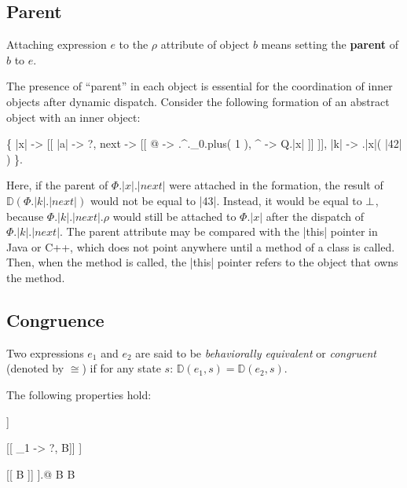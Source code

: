 \subsection{Parent}

\begin{definition}[Parent]
Attaching expression \(e\) to the \(\rho\) attribute of object \(b\)
means setting the \textbf{parent} of \(b\) to \(e\).
\end{definition}

The presence of ``parent'' in each object is essential for the coordination of inner
objects after dynamic dispatch. Consider the following formation of an abstract object
with an inner object:
\begin{phiquation*}
\Big\{ |x| -> [[ |a| -> ?, next -> [[ @ -> \xi.^.\alpha_0.plus( 1 ), ^ -> Q.|x| ]] ]], |k| -> \xi.|x|( |42| ) \Big\}.
\end{phiquation*}
Here, if the parent of \(\Phi.|x|.|next|\) were attached in the formation, the result of \(\mathbb{D}(\Phi.|k|.|next|)\)
would not be equal to |43|. Instead, it would be equal to \(\bot\), because \(\Phi.|k|.|next|.\rho\)
would still be attached to \(\Phi.|x|\) after the dispatch of \(\Phi.|k|.|next|\).
The parent attribute may be compared with the |this| pointer in Java or C++, which
does not point anywhere until a method of a class is called. Then, when the method
is called, the |this| pointer refers to the object that owns the method.

\subsection{Congruence}

Two expressions \(e_1\) and \(e_2\) are said to be \emph{behaviorally equivalent}
or \emph{congruent} (denoted by \(\cong\)) if for any state \(s\): \(\mathbb{D}(e_1, s) = \mathbb{D}(e_2, s)\).

The following properties hold:
\begin{phiquation*}
\nf \cong [[ @ -> \nf ]] \quad {}

[[ \tau_1 -> ?, B]] \cong [[ B ]] \quad {}

[[ B ]] \cong [[ B ]].@ \quad{}\;  \in B \;\; \stx{\Delta} \not\in B \quad {}
\end{phiquation*}

